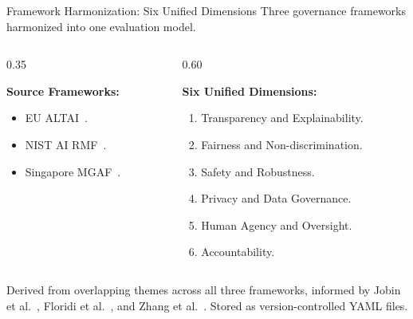 \begin{frame}{Framework Harmonization: Six Unified Dimensions}
    Three governance frameworks harmonized into one evaluation model.

    \vspace{4pt}
    \begin{columns}[T]
        \begin{column}{0.35\textwidth}
            {\small
            \textbf{Source Frameworks:}
            \begin{itemize}
                \item EU ALTAI~\cite{aihleg2019ethics, aihleg2020altai}.
                \item NIST AI RMF~\cite{nist2023rmf}.
                \item Singapore MGAF~\cite{pdpc2020mgaf}.
            \end{itemize}
            }
        \end{column}
        \begin{column}{0.60\textwidth}
            {\small
            \textbf{Six Unified Dimensions:}
            \begin{enumerate}
                \item Transparency and Explainability.
                \item Fairness and Non-discrimination.
                \item Safety and Robustness.
                \item Privacy and Data Governance.
                \item Human Agency and Oversight.
                \item Accountability.
            \end{enumerate}
            }
        \end{column}
    \end{columns}

    \vspace{6pt}
    {\small Derived from overlapping themes across all three frameworks, informed by Jobin et al.~\cite{jobin2019global}, Floridi et al.~\cite{floridi2018ai4people}, and Zhang et al.~\cite{zhang2023fairness}. Stored as version-controlled YAML files.}
\end{frame}


